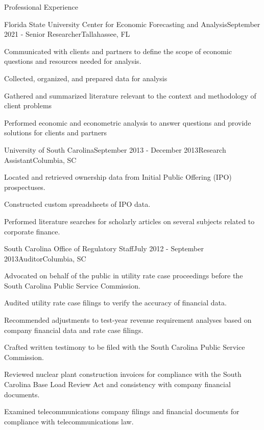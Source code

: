 \documentclass{resume} %
\begin{document}
\begin{rSection}{Professional Experience}
    

\begin{rSubsection}{Florida State University Center for Economic Forecasting and Analysis}{September 2021 - }{Senior Researcher}{Tallahassee, FL}
	\item Communicated with clients and partners to define the scope of economic questions  and resources needed for analysis.
	\item Collected, organized, and prepared data for analysis
	\item Gathered and summarized literature relevant to the context and methodology of client problems
	\item Performed economic and econometric analysis to answer questions and provide solutions for clients and partners
\end{rSubsection}


\begin{rSubsection}{University of South Carolina}{September 2013 - December 2013}{Research Assistant}{Columbia, SC}
    \item Located and retrieved ownership data from Initial Public Offering (IPO) prospectuses.
    \item Constructed custom spreadsheets of IPO data.
    \item Performed literature searches for scholarly articles on several subjects related to corporate finance.
\end{rSubsection}

\begin{rSubsection}{South Carolina Office of Regulatory Staff}{July 2012 - September 2013}{Auditor}{Columbia, SC}
    \item Advocated on behalf of the public in utility rate case proceedings before the South Carolina Public Service Commission.
    \item Audited utility rate case filings to verify the accuracy of financial data.
    \item Recommended adjustments to test-year revenue requirement analyses based on company financial data and rate case filings.
    \item Crafted written testimony to be filed with the South Carolina Public Service Commission.
    \item Reviewed nuclear plant construction invoices for compliance with the South Carolina Base Load Review Act and consistency with company financial documents.
    \item Examined telecommunications company filings and financial documents for compliance with telecommunications law.


\end{rSubsection}
\end{rSection}
\end{document}
